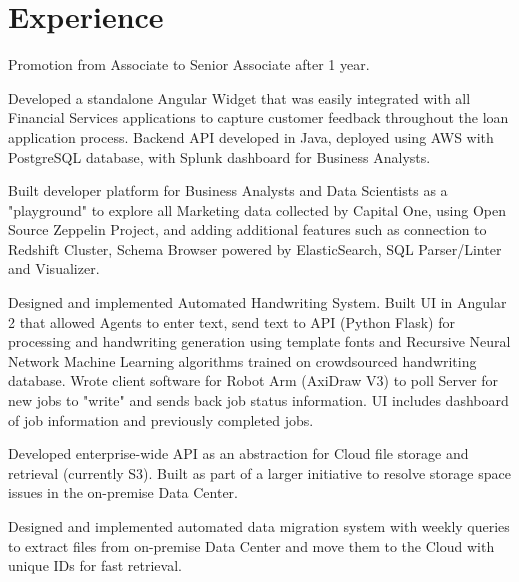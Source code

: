 \documentclass[letterpaper]{deedy-resume} %
\begin{document}
\begin{minipage}[t]{0.66\textwidth} %


\section{Experience}


\vspace{\topsep} %
\begin{tightitemize}
\item Promotion from Associate to Senior Associate after 1 year.
\item Developed a standalone Angular Widget that was easily integrated with all Financial Services applications to capture customer feedback throughout the loan application process. Backend API developed in Java, deployed using AWS with PostgreSQL database, with Splunk dashboard for Business Analysts.
\item Built developer platform for Business Analysts and Data Scientists as a "playground" to explore all Marketing data collected by Capital One, using Open Source Zeppelin Project, and adding additional features such as connection to Redshift Cluster, Schema Browser powered by ElasticSearch, SQL Parser/Linter and Visualizer. 
\item Designed and implemented Automated Handwriting System. Built UI in Angular 2 that allowed Agents to enter text, send text to API (Python Flask) for processing and handwriting generation using template fonts and Recursive Neural Network Machine Learning algorithms trained on crowdsourced handwriting database. Wrote client software for Robot Arm (AxiDraw V3) to poll Server for new jobs to "write" and sends back job status information. UI includes dashboard of job information and previously completed jobs. 
\item Developed enterprise-wide API as an abstraction for Cloud file storage and retrieval (currently S3). Built as part of a larger initiative to resolve storage space issues in the on-premise Data Center.
\item Designed and implemented automated data migration system with weekly queries to extract files from on-premise Data Center and move them to the Cloud with unique IDs for fast retrieval. 
\end{tightitemize}


\end{minipage}
\end{document}

